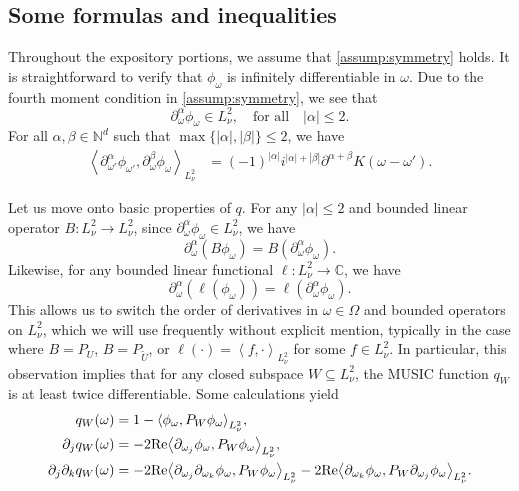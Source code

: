\documentclass[11pt]{article}
\theoremstyle{definition}
\numberwithin{theorem}{section}
\numberwithin{lemma}{section}
\numberwithin{equation}{section}
\def\C{\mathbb{C}}
\def\N{\mathbb{N}}
\renewcommand{\subset}{\subseteq}
\renewcommand{\tilde}{\widetilde}
\renewcommand{\Re}{{\rm Re}}
\def\forallspace{\quad\text{for all}\quad}
\newcommand{\inner}[1]{{\left\langle#1\right\rangle}}
\numberwithin{equation}{section}
\begin{document}
	\subsection{Some formulas and inequalities}
	\label{sec:geometricformulas}
	
	Throughout the expository portions, we assume that \cref{assump:symmetry} holds. It is straightforward to verify that $\phi_\omega$ is infinitely differentiable in $\omega$. Due to the fourth moment condition in \cref{assump:symmetry}, we see that 
	$$
	\partial^\alpha_\omega \phi_\omega\in L^2_\nu, \forallspace |\alpha|\leq 2.
	$$
	For all $\alpha,\beta\in \N^d$ such that $\max\{|\alpha|,|\beta|\}\leq 2$, we have
	\begin{equation}
	\begin{split}
		\inner{\partial_{\omega'}^\alpha \phi_{\omega'}, \partial_\omega^\beta \phi_\omega}_{L^2_\nu}
		&= (-1)^{|\alpha|} i^{|\alpha|+|\beta|}  \partial^{\alpha+\beta} K(\omega-\omega'). 
	\end{split} \label{eq:Kgradient}
	\end{equation}
	
	Let us move onto basic properties of $q$. For any $|\alpha|\leq 2$ and bounded linear operator $B\colon L^2_\nu \to L^2_\nu$, since $\partial_\omega^\alpha \phi_\omega\in L^2_\nu$, we have 
	$$
	\partial_\omega^\alpha (B\phi_\omega) 
	= B (\partial_\omega^\alpha \phi_\omega). 
	$$
	Likewise, for any bounded linear functional $\ell\colon L^2_\nu\to \C$, we have
	$$
	\partial_\omega^\alpha (\ell (\phi_\omega)) 
	= \ell (\partial_\omega^\alpha \phi_\omega). 
	$$
	This allows us to switch the order of derivatives in $\omega\in\Omega$ and bounded operators on $L^2_\nu$, which we will use frequently without explicit mention, typically in the case where $B=P_U$, $B=P_{\tilde U}$, or $\ell(\cdot)=\inner{f,\cdot}_{L^2_\nu}$ for some $f\in L^2_\nu$. In particular, this observation implies that for any closed subspace $W\subset L^2_\nu$, the MUSIC function $q_W$ is at least twice differentiable. Some calculations yield
	\begin{align}
		q_W(\omega)
		&=1- \inner{\phi_\omega, P_W \phi_\omega}_{L^2_\nu}, \label{eq:q0} \\
		\partial_j q_W(\omega)
		&=-2\Re \inner{\partial_{\omega_j} \phi_\omega, P_{W} \phi_\omega}_{L^2_\nu}, \label{eq:q1} \\
		\partial_j \partial_k q_{W}(\omega)
		&=-2\Re \inner{\partial_{\omega_j} \partial_{\omega_k} \phi_\omega, P_{W} \phi_\omega}_{L^2_\nu} - 2 \Re \inner{\partial_{\omega_k} \phi_\omega, P_W \partial_{\omega_j}\phi_\omega}_{L^2_\nu}. \label{eq:q2}
	\end{align}
    
\end{document}
